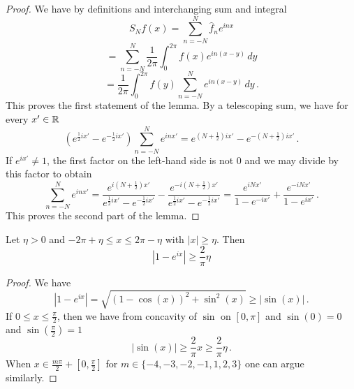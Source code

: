\begin{proof}
\leanok
We have by definitions and interchanging sum and integral
   \begin{equation*}
        S_Nf(x)=\sum_{n=-N}^N \widehat{f}_n e^{inx}
    \end{equation*}
       \begin{equation*}
    =\sum_{n=-N}^N \frac 1{2\pi}\int_{0}^{2\pi}
    f(x) e^{in(x-y)}\, dy
    \end{equation*}
 \begin{equation}\label{eq-expsum}
     =\frac 1{2\pi}\int_{0}^{2\pi}
    f(y) \sum_{n=-N}^N e^{in(x-y)}\, dy\, .
 \end{equation}
This proves the first statement of the lemma.
By a telescoping sum, we have for every $x'\in {\mathbb{R}}$
\begin{equation}
    \left( e^{\frac 12 ix'}-e^{-\frac 12 ix'}\right) \sum_{n=-N}^N e^{inx'}= e^{(N+\frac 12) ix'}-e^{-(N+\frac 12) ix'}\, .
\end{equation}
If $e^{ix'}\neq 1$, the first factor on the left-hand side is not $0$ and we may divide by this factor to obtain
\begin{equation}
      \sum_{n=-N}^N e^{inx'}= \frac{e^{i(N+\frac 1 2)x'}}{e^{\frac 12 ix'}-e^{-\frac 12ix'}}
      -\frac{e^{-i(N+\frac 1 2)x'}}{e^{\frac 12 ix'}-e^{-\frac 12ix'}}
       =\frac{e^{iNx'}}{1-e^{-ix'}}
      +\frac {e^{-iNx'}}{1-e^{ix'}}\, .
\end{equation}
This proves the second part of the lemma.
\end{proof}

\begin{lemma}
    \label{lower-secant-bound}
    \leanok
    Let $\eta>0$ and $-2\pi +\eta \le x\le 2\pi-\eta$ with $|x|\ge \eta$. Then
    \begin{equation}
        |1-e^{ix}|\ge \frac{2}{\pi} \eta
    \end{equation}
\end{lemma}
\begin{proof}
    \leanok
    We have
    $$
        |1 - e^{ix}| = \sqrt{(1 - \cos(x))^2 + \sin^2(x)} \ge |\sin(x)|\,.
    $$
    If $0 \le x \le \frac{\pi}{2}$, then we have from concavity of $\sin$ on $[0, \pi]$ and $\sin(0) = 0$ and $\sin(\frac{\pi}{2}) = 1$
    $$
        |\sin(x)| \ge \frac{2}{\pi} x \ge \frac{2}{\pi} \eta\,.
    $$
    When $x\in \frac{m\pi}{2} + [0, \frac{\pi}{2}]$ for $m \in \{-4, -3, -2, -1, 1, 2, 3\}$ one can argue similarly.
\end{proof}

